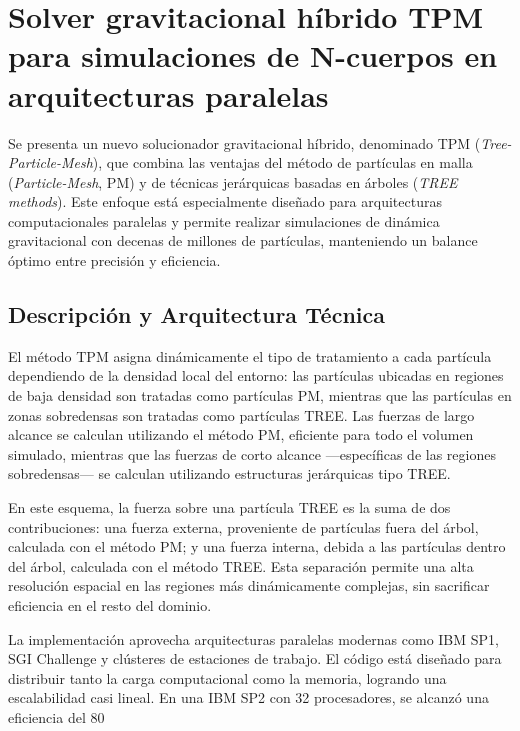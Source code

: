 \section[Producto 07: Solver gravitacional híbrido TPM]{Solver gravitacional híbrido TPM para simulaciones de N-cuerpos en arquitecturas paralelas}

Se presenta un nuevo solucionador gravitacional híbrido, denominado TPM (\textit{Tree-Particle-Mesh}), que combina las ventajas del método de partículas en malla (\textit{Particle-Mesh}, PM) y de técnicas jerárquicas basadas en árboles (\textit{TREE methods}). Este enfoque está especialmente diseñado para arquitecturas computacionales paralelas y permite realizar simulaciones de dinámica gravitacional con decenas de millones de partículas, manteniendo un balance óptimo entre precisión y eficiencia.

\subsection{Descripción y Arquitectura Técnica}

El método TPM asigna dinámicamente el tipo de tratamiento a cada partícula dependiendo de la densidad local del entorno: las partículas ubicadas en regiones de baja densidad son tratadas como partículas PM, mientras que las partículas en zonas sobredensas son tratadas como partículas TREE. Las fuerzas de largo alcance se calculan utilizando el método PM, eficiente para todo el volumen simulado, mientras que las fuerzas de corto alcance —específicas de las regiones sobredensas— se calculan utilizando estructuras jerárquicas tipo TREE.

En este esquema, la fuerza sobre una partícula TREE es la suma de dos contribuciones: una fuerza externa, proveniente de partículas fuera del árbol, calculada con el método PM; y una fuerza interna, debida a las partículas dentro del árbol, calculada con el método TREE. Esta separación permite una alta resolución espacial en las regiones más dinámicamente complejas, sin sacrificar eficiencia en el resto del dominio.

La implementación aprovecha arquitecturas paralelas modernas como IBM SP1, SGI Challenge y clústeres de estaciones de trabajo. El código está diseñado para distribuir tanto la carga computacional como la memoria, logrando una escalabilidad casi lineal. En una IBM SP2 con 32 procesadores, se alcanzó una eficiencia del 80%

